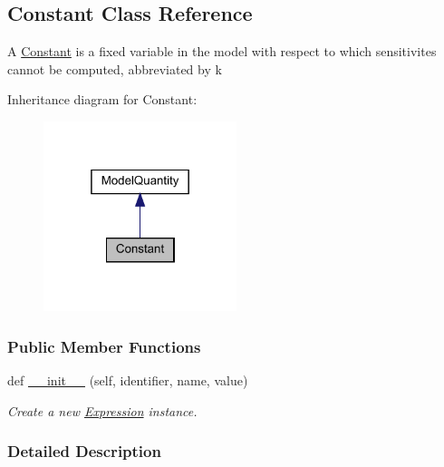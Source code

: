 \hypertarget{classamici_1_1ode__export_1_1_constant}{}\subsection{Constant Class Reference}
\label{classamici_1_1ode__export_1_1_constant}


A \mbox{\hyperlink{classamici_1_1ode__export_1_1_constant}{Constant}} is a fixed variable in the model with respect to which sensitivites cannot be computed, abbreviated by {\ttfamily k}  




Inheritance diagram for Constant\+:
\nopagebreak
\begin{figure}[H]
\begin{center}
\leavevmode
\includegraphics[width=160pt]{classamici_1_1ode__export_1_1_constant__inherit__graph}
\end{center}
\end{figure}
\subsubsection*{Public Member Functions}
\begin{DoxyCompactItemize}
\item 
def \mbox{\hyperlink{classamici_1_1ode__export_1_1_constant_a258843a3afab00b576ccf386e8673a64}{\+\_\+\+\_\+init\+\_\+\+\_\+}} (self, identifier, name, value)
\begin{DoxyCompactList}\small\item\em Create a new \mbox{\hyperlink{classamici_1_1ode__export_1_1_expression}{Expression}} instance. \end{DoxyCompactList}\end{DoxyCompactItemize}


\subsubsection{Detailed Description}


